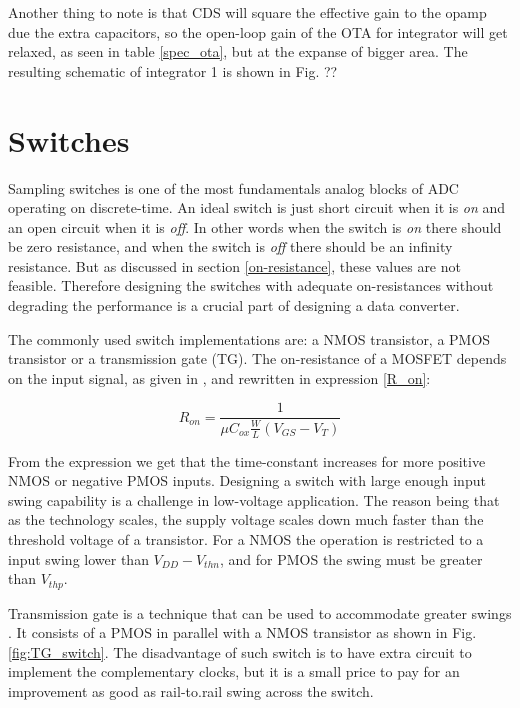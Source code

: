 Another thing to note is that CDS will square the effective gain to the opamp due the extra capacitors, so the open-loop gain of the OTA for integrator will get relaxed, as seen in table \ref{spec_ota}, but at the expanse of bigger area. The resulting schematic of integrator 1 is shown in Fig. ?? 


\section{Switches}
Sampling switches is one of the most fundamentals analog blocks of ADC operating on discrete-time. An ideal switch is just short circuit when it is \textit{on} and an open circuit when it is \textit{off}. In other words when the switch is \textit{on} there should be zero resistance, and when the switch is \textit{off} there should be an infinity resistance. But as discussed in section \ref{on-resistance}, these values are not feasible. Therefore designing the switches with adequate on-resistances without degrading the performance is a crucial part of designing a data converter. 

The commonly used switch implementations are: a NMOS transistor, a PMOS transistor or a transmission gate (TG). The on-resistance of a MOSFET depends on the input signal, as given in \cite{Allen}, and rewritten in expression \ref{R_on}:

\begin{equation}\label{R_on}
    R_{on} = \frac{1}{\mu C_{ox}\frac{W}{L}(V_{GS} - V_T)}
\end{equation}

From the expression we get that the time-constant increases for more positive NMOS or negative PMOS inputs. Designing a switch with large enough input swing capability is a challenge in low-voltage application. The reason being that as the technology scales, the supply voltage scales down much faster than the threshold voltage of a transistor. For a NMOS the operation is restricted to a input swing lower than $V_{DD} - V_{thn}$, and for PMOS the swing must be greater than $V_{thp}$. 

Transmission gate is a technique that can be used to accommodate greater swings \cite{Barker}. It consists of a PMOS in parallel with a NMOS transistor as shown in Fig. \ref{fig:TG_switch}. The disadvantage of such switch is to have extra circuit to implement the complementary clocks, but it is a small price to pay for an improvement as good as rail-to.rail swing across the switch.     

